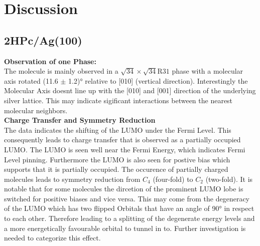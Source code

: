 \chapter{Discussion}
\label{sec:Discussion}

\section{2HPc/Ag(100)}
\textbf{Observation of one Phase:}\\
The molecule is mainly observed in a $\sqrt{34} \times  \sqrt{34}\text{R}31$ phase with a molecular axis rotated (11.6 $\pm$ 1.2)° relative to [010] (vertical direction).
Interestingly the Molecular Axis doesnt line up with the [010] and [001] direction of the underlying silver lattice.
This may indicate sigificant interactions between the nearest molecular neighbors.\\
\textbf{Charge Transfer and Symmetry Reduction}\\
The data indicates the shifting of the LUMO under the Fermi Level.
This consequently leads to charge transfer that is observed as a partially occupied LUMO.
The LUMO is seen well near the Fermi Energy, which indicates Fermi Level pinning.
Furthermore the LUMO is also seen for postive bias which supports that it is partially occupied.
The occurence of partially charged molecules leads to symmetry reduction from $C_4$ (four-fold) to $C_2$ (two-fold).
It is notable that for some molecules the dircetion of the prominent LUMO lobe is switched for positive biases and vice versa.
This may come from the degeneracy of the LUMO which has two flipped Orbitals that have an angle of 90° in respect to each other.
Therefore leading to a splitting of the degenerate energy levels and a more energetically favourable orbital to tunnel in to.
Further investigation is needed to categorize this effect.
  




